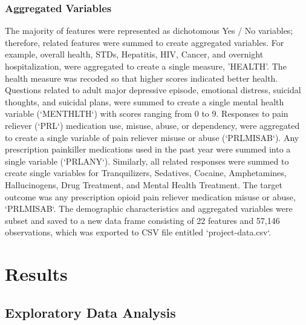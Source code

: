 \documentclass[sigconf]{acmart}
\begin{document}
\subsubsection{Aggregated Variables}

The majority of features were represented as dichotomous Yes / No variables; 
therefore, related features were summed to create aggregated variables. 
For example, overall health, STDs, Hepatitis, HIV, Cancer, and overnight
hospitalization, were aggregated to create a single measure, 'HEALTH'. The 
health measure was recoded so that higher scores indicated better health. 
Questions related to adult major depressive episode, emotional distress, 
suicidal thoughts, and suicidal plans, were summed to create a single mental 
health variable (`MENTHLTH`) with scores ranging from 0 to 9. Responses to 
pain reliever (`PRL`) medication use, misuse, abuse, or dependency, were 
aggregated to create a single variable of pain reliever misuse or abuse 
(`PRLMISAB`). Any prescription painkiller medications used in the past year 
were summed into a single variable (`PRLANY`). Similarly, all related responses 
were summed to create single variables for Tranquilizers, Sedatives, Cocaine, 
Amphetamines, Hallucinogens, Drug Treatment, and Mental Health Treatment. 
The target outcome was any prescription opioid pain reliever medication misuse 
or abuse, `PRLMISAB`. The demographic characteristics and aggregated variables 
were subset and saved to a new data frame consisting of 22 features and 57,146 
observations, which was exported to CSV file entitled `project-data.csv`. 





\section{Results}

\subsection{Exploratory Data Analysis}
\end{document}
